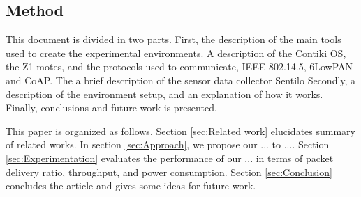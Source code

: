 \subsection{Method}

This document is divided in two parts.
First,
	the description of the main tools used to create the experimental environments.
A description of the Contiki OS,
	the Z1 motes,
	and the protocols used to communicate,
	IEEE 802.14.5, 6LowPAN and CoAP.
The a brief description of the sensor data collector Sentilo Secondly,
	a description of the environment setup,
	and an explanation of how it works.
Finally,
	conclusions and future work is presented.



This paper is organized as follows.
Section \ref{sec:Related work} elucidates summary of related works.
In section \ref{sec:Approach}, we propose our ... to ....
Section \ref{sec:Experimentation} evaluates the performance of our ... in terms of packet delivery ratio,
	throughput,
	and power consumption.
Section \ref{sec:Conclusion} concludes the article and gives some ideas for future work.
